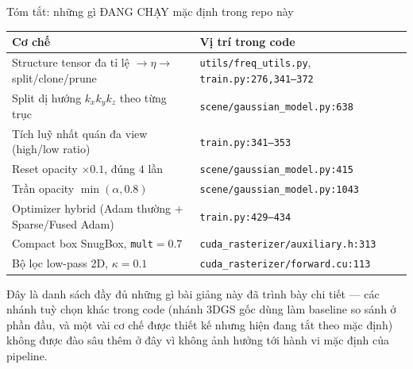 \begin{frame}{Tóm tắt: những gì ĐANG CHẠY mặc định trong repo này}
\scriptsize
\begin{center}
\begin{tabular}{ll}
\toprule
\textbf{Cơ chế} & \textbf{Vị trí trong code}\\
\midrule
Structure tensor đa tỉ lệ $\to\eta\to$ split/clone/prune & \texttt{utils/freq\_utils.py}, \texttt{train.py:276,341--372}\\
Split dị hướng $k_x k_y k_z$ theo từng trục & \texttt{scene/gaussian\_model.py:638}\\
Tích luỹ nhất quán đa view (high/low ratio) & \texttt{train.py:341--353}\\
Reset opacity $\times0.1$, đúng $4$ lần & \texttt{scene/gaussian\_model.py:415}\\
Trần opacity $\min(\alpha,0.8)$ & \texttt{scene/gaussian\_model.py:1043}\\
Optimizer hybrid (Adam thường $+$ Sparse/Fused Adam) & \texttt{train.py:429--434}\\
Compact box SnugBox, \texttt{mult}$=0.7$ & \texttt{cuda\_rasterizer/auxiliary.h:313}\\
Bộ lọc low-pass 2D, $\kappa=0.1$ & \texttt{cuda\_rasterizer/forward.cu:113}\\
\bottomrule
\end{tabular}
\end{center}
\footnotesize Đây là danh sách đầy đủ những gì bài giảng này đã trình bày chi tiết --- các nhánh tuỳ chọn khác trong
code (nhánh 3DGS gốc dùng làm baseline so sánh ở phần đầu, và một vài cơ chế được thiết kế nhưng hiện đang tắt theo
mặc định) không được đào sâu thêm ở đây vì không ảnh hưởng tới hành vi mặc định của pipeline.
\end{frame}

